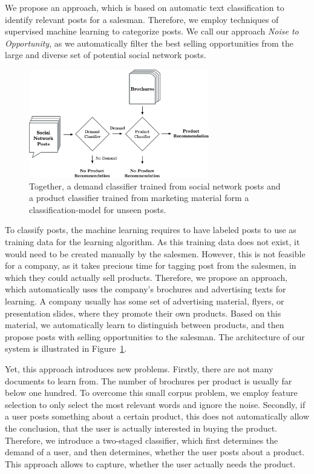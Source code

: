 We propose an approach, which is based on automatic text classification to identify relevant posts for a salesman.
Therefore, we employ techniques of supervised machine learning to categorize posts.
We call our approach \emph{Noise to Opportunity}, as we automatically filter the best selling opportunities from the large and diverse set of potential social network posts.
\begin{figure}
	\label{fig:figureone}
	\begin{center}
		\includegraphics[width=0.7\textwidth]{figures/nto_workflow.eps}
	\end{center}
	\caption{Together, a demand classifier trained from social network posts and a product classifier trained from marketing material form a classification-model for unseen posts.}
\end{figure}

To classify posts, the machine learning requires to have labeled posts to use as training data for the learning algorithm.
As this training data does not exist, it would need to be created manually by the salesmen.
However, this is not feasible for a company, as it takes precious time for tagging post from the salesmen, in which they could actually sell products.
Therefore, we propose an approach, which automatically uses the company's brochures and advertising texts for learning.
A company usually has some set of advertising material, flyers, or presentation slides, where they promote their own products.
Based on this material, we automatically learn to distinguish between products, and then propose posts with selling opportunities to the salesman.
The architecture of our system is illustrated in Figure~\ref{fig:figureone}.

Yet, this approach introduces new problems.
Firstly, there are not many documents to learn from.
The number of brochures per product is usually far below one hundred.
To overcome this small corpus problem, we employ feature selection to only select the most relevant words and ignore the noise.
Secondly, if a user posts something about a certain product, this does not automatically allow the conclusion, that the user is actually interested in buying the product.
Therefore, we introduce a two-staged classifier, which first determines the demand of a user, and then determines, whether the user posts about a product.
This approach allows to capture, whether the user actually needs the product.

